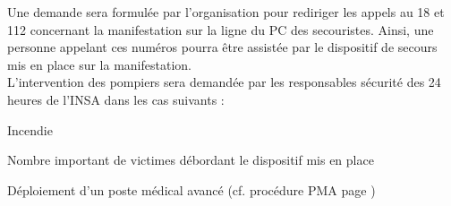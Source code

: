 \documentclass[hidelinks, paper=a4, fontsize=13pt]{report}
\begin{document}
Une demande sera formulée par l’organisation pour rediriger les appels au 18 et 112 concernant la manifestation sur la ligne du PC des secouristes. Ainsi, une personne appelant ces numéros pourra être assistée par le dispositif de secours mis en place sur la manifestation.\\

L’intervention des pompiers sera demandée par les responsables sécurité des 24 heures de l'INSA dans les cas suivants :
\begin{list}{•}{}
	\item Incendie
	\item Nombre important de victimes débordant le dispositif mis en place
	\item Déploiement d’un poste médical avancé (cf. procédure PMA page \pageref{refProcedurePMA})
\end{list}

\newpage
\end{document}
